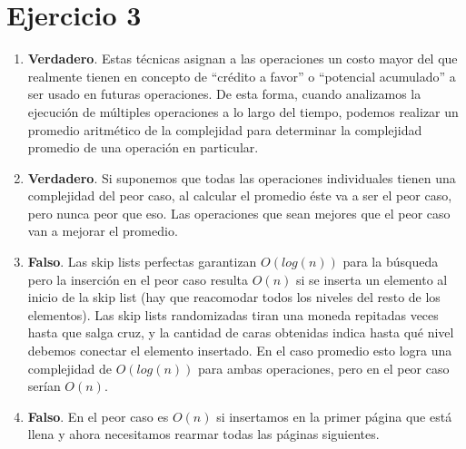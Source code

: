 \section*{Ejercicio 3}

\begin{enumerate}
    \item \textbf{Verdadero}. Estas técnicas asignan a las operaciones un costo mayor del que realmente tienen en concepto de ``crédito a favor'' o ``potencial acumulado'' a ser usado en futuras operaciones. De esta forma, cuando analizamos la ejecución de múltiples operaciones a lo largo del tiempo, podemos realizar un promedio aritmético de la complejidad para determinar la complejidad promedio de una operación en particular.
    \item \textbf{Verdadero}. Si suponemos que todas las operaciones individuales tienen una complejidad del peor caso, al calcular el promedio éste va a ser el peor caso, pero nunca peor que eso. Las operaciones que sean mejores que el peor caso van a mejorar el promedio.
    \item \textbf{Falso}. Las skip lists perfectas garantizan $O(log(n))$ para la búsqueda pero la inserción en el peor caso resulta $O(n)$ si se inserta un elemento al inicio de la skip list (hay que reacomodar todos los niveles del resto de los elementos). Las skip lists randomizadas tiran una moneda repitadas veces hasta que salga cruz, y la cantidad de caras obtenidas indica hasta qué nivel debemos conectar el elemento insertado. En el caso promedio esto logra una complejidad de $O(log(n))$ para ambas operaciones, pero en el peor caso serían $O(n)$.
    \item \textbf{Falso}. En el peor caso es $O(n)$ si insertamos en la primer página que está llena y ahora necesitamos rearmar todas las páginas siguientes.
\end{enumerate}
